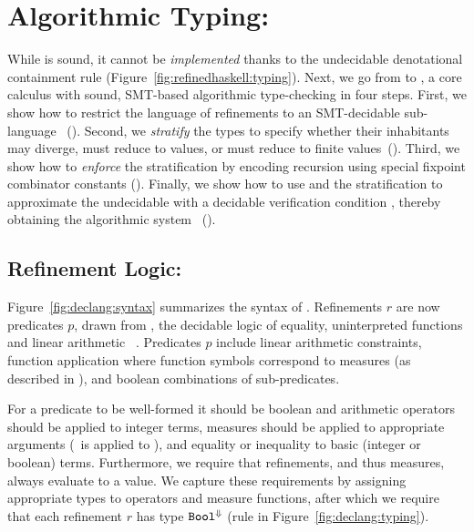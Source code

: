 \renewcommand\rimpl{\rsubbase}
\renewcommand{\rtdimp}{\rsubbased}
%
\section{Algorithmic Typing: \declang}\label{sec:typing}



While \undeclang is sound, it cannot be \emph{implemented} 
thanks to the undecidable denotational containment rule \rsubbase
(Figure~\ref{fig:refinedhaskell:typing}).
%
Next, we go from \undeclang to \declang, a core calculus 
with sound, SMT-based algorithmic type-checking in four 
steps.
%
First, we show how to restrict the language of 
refinements to an SMT-decidable sub-language 
\logiclang~().
%
Second, we \emph{stratify} the types to specify 
whether their inhabitants may diverge, must reduce
to values, or must reduce to finite values~().
%
Third, we show how to \emph{enforce} the stratification
by encoding recursion using special fixpoint combinator 
constants ().
%
Finally, we show how to use \logiclang and the 
stratification to approximate the undecidable \rsubbase
with a decidable verification condition \rsubbased, thereby 
obtaining the algorithmic system \declang~().


\subsection{Refinement Logic: \logiclang}\label{sec:typing:logic}

Figure~\ref{fig:declang:syntax} summarizes the syntax of \declang.
Refinements $r$ are now predicates $p$, drawn from 
\logiclang, the decidable logic of equality, 
uninterpreted functions and linear arithmetic
~\cite{Nelson81}.
%
Predicates $p$ include linear arithmetic constraints,
function application where function symbols correspond
to measures (as described in ), and 
boolean combinations of sub-predicates.

For a predicate to be well-formed it should be boolean and
arithmetic operators 
should be applied to integer terms, measures should be applied 
to appropriate arguments 
(\ie \eisNull\ is applied to \tintlist),
and equality or inequality to basic 
(integer or boolean) terms.
%
Furthermore, we require that refinements, and thus measures,
always evaluate to a value.
%
We capture these requirements by assigning appropriate types 
to operators and measure functions, after which we require that
each refinement $r$ has type ${\texttt{Bool}}^{\Downarrow}$ (rule \rwbased in
Figure~\ref{fig:declang:typing}).

